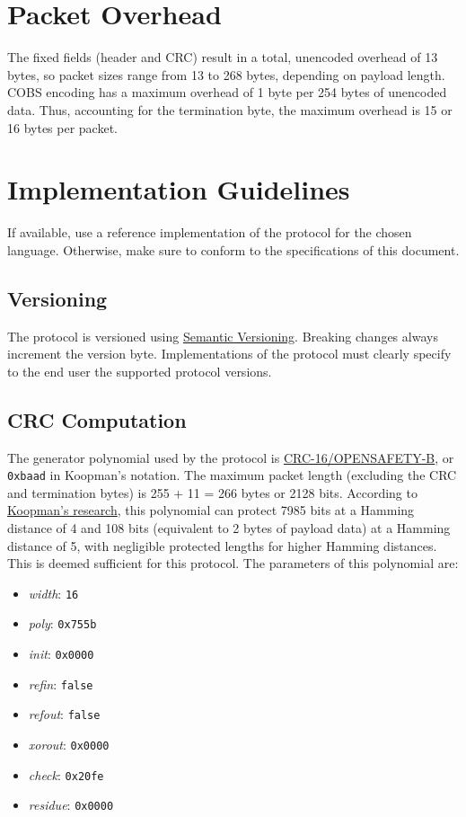 \documentclass[a4paper,11pt,english]{article}
\begin{document}
\section{Packet Overhead}

The fixed fields (header and CRC) result in a total, unencoded overhead of 13 bytes, so packet sizes range from 13 to 268 bytes, depending on payload length. COBS encoding has a maximum overhead of 1 byte per 254 bytes of unencoded data. Thus, accounting for the termination byte, the maximum overhead is 15 or 16 bytes per packet.

\section{Implementation Guidelines}

If available, use a reference implementation of the protocol for the chosen language. Otherwise, make sure to conform to the specifications of this document.

\subsection{Versioning}

The protocol is versioned using \href{https://semver.org/}{Semantic Versioning}. Breaking changes always increment the version byte. Implementations of the protocol must clearly specify to the end user the supported protocol versions.

\subsection{CRC Computation}

The generator polynomial used by the protocol is \href{https://reveng.sourceforge.io/crc-catalogue/all.htm#crc.cat.crc-16-opensafety-b}{CRC-16/OPENSAFETY-B}, or \texttt{0xbaad} in Koopman's notation. The maximum packet length (excluding the CRC and termination bytes) is 255 + 11 = 266 bytes or 2128 bits. According to \href{https://users.ece.cmu.edu/~koopman/crc/c16/0xbaad_len.txt}{Koopman's research}, this polynomial can protect 7985 bits at a Hamming distance of 4 and 108 bits (equivalent to 2 bytes of payload data) at a Hamming distance of 5, with negligible protected lengths for higher Hamming distances. This is deemed sufficient for this protocol. The parameters of this polynomial are:

\begin{itemize}
  \item \textit{width}: \texttt{16}
  \item \textit{poly}: \texttt{0x755b}
  \item \textit{init}: \texttt{0x0000}
  \item \textit{refin}: \texttt{false}
  \item \textit{refout}: \texttt{false}
  \item \textit{xorout}: \texttt{0x0000}
  \item \textit{check}: \texttt{0x20fe}
  \item \textit{residue}: \texttt{0x0000}
\end{itemize}
\end{document}
